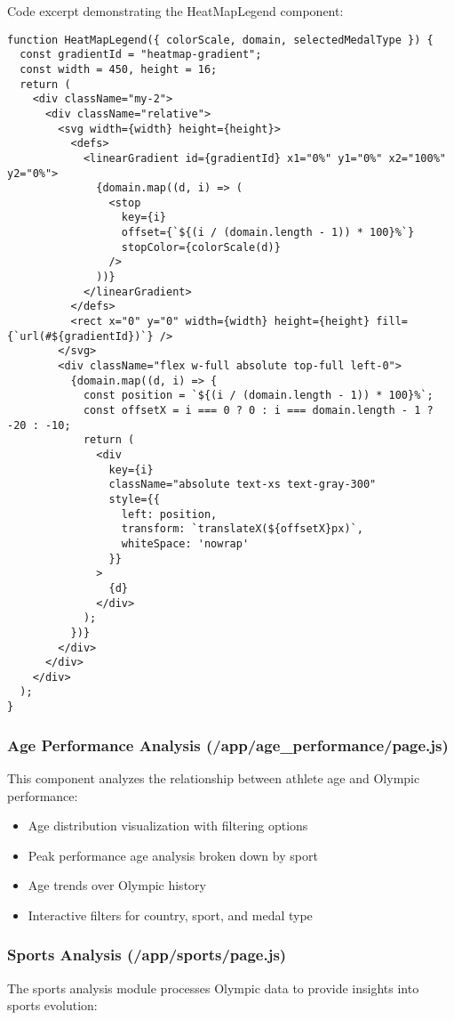 \documentclass[a4paper, 12pt]{article}
\begin{document}
Code excerpt demonstrating the HeatMapLegend component:

\begin{verbatim}
function HeatMapLegend({ colorScale, domain, selectedMedalType }) {
  const gradientId = "heatmap-gradient";
  const width = 450, height = 16;
  return (
    <div className="my-2">
      <div className="relative">
        <svg width={width} height={height}>
          <defs>
            <linearGradient id={gradientId} x1="0%" y1="0%" x2="100%" y2="0%">
              {domain.map((d, i) => (
                <stop
                  key={i}
                  offset={`${(i / (domain.length - 1)) * 100}%`}
                  stopColor={colorScale(d)}
                />
              ))}
            </linearGradient>
          </defs>
          <rect x="0" y="0" width={width} height={height} fill={`url(#${gradientId})`} />
        </svg>
        <div className="flex w-full absolute top-full left-0">
          {domain.map((d, i) => {
            const position = `${(i / (domain.length - 1)) * 100}%`;
            const offsetX = i === 0 ? 0 : i === domain.length - 1 ? -20 : -10;
            return (
              <div 
                key={i} 
                className="absolute text-xs text-gray-300"
                style={{
                  left: position,
                  transform: `translateX(${offsetX}px)`,
                  whiteSpace: 'nowrap'
                }}
              >
                {d}
              </div>
            );
          })}
        </div>
      </div>
    </div>
  );
}
\end{verbatim}

\subsubsection{Age Performance Analysis (/app/age\_performance/page.js)}
This component analyzes the relationship between athlete age and Olympic performance:

\begin{itemize}[leftmargin=*]
    \item Age distribution visualization with filtering options
    \item Peak performance age analysis broken down by sport
    \item Age trends over Olympic history
    \item Interactive filters for country, sport, and medal type
\end{itemize}

\subsubsection{Sports Analysis (/app/sports/page.js)}
The sports analysis module processes Olympic data to provide insights into sports evolution:
\end{document}
